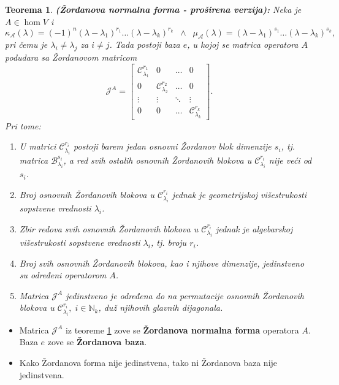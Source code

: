 \documentclass[a4paper,12pt,twoside]{report}
\newtheorem{theorem}{Teorema}[section]
\numberwithin{algorithm}{section}
\begin{document}
\begin{theorem}
    \label{zordan1}
    \textbf{(Žordanova normalna forma - proširena verzija):} Neka je $A \in \hom V$ i 
    \[ \kappa_\mathcal{A}(\lambda) = (-1)^n (\lambda - \lambda_1)^{r_1}\dots (\lambda - \lambda_k)^{r_k} \;\;\land \;\; \mu_\mathcal{A}(\lambda) =  (\lambda - \lambda_1)^{s_1}\dots (\lambda - \lambda_k)^{s_k},\]
    pri čemu je $\lambda_i \neq \lambda_j$ za $i \neq j$. Tada postoji baza $e$, u kojoj se matrica operatora $A$ podudara sa Žordanovom matricom
    \[ \mathcal{J}^A = \begin{bmatrix}
        \mathcal{C}_{\lambda_1}^{r_1} & 0 & \dots & 0 \\
        0 & \mathcal{C}_{\lambda_2}^{r_2} & \dots & 0 \\
        \vdots & \vdots & \ddots & \vdots \\
        0 & 0 & \dots & \mathcal{C}_{\lambda_k}^{r_k}
    \end{bmatrix}. \] Pri tome:
    \begin{enumerate}
        \item U matrici $\mathcal{C}_{\lambda_i}^{r_i}$ postoji barem jedan osnovni Žordanov blok dimenzije $s_i$, tj. matrica $\mathcal{B}_{\lambda_i}^{s_i}$, 
        a red svih ostalih osnovnih Žordanovih blokova u $\mathcal{C}_{\lambda_i}^{r_i}$ nije veći od $s_i$.
        \item Broj osnovnih Žordanovih blokova u $\mathcal{C}_{\lambda_i}^{r_i}$ jednak je geometrijskoj višestrukosti sopstvene vrednosti $\lambda_i$.
        \item Zbir redova svih osnovnih Žordanovih blokova u $\mathcal{C}_{\lambda_i}^{r_i}$ jednak je algebarskoj višestrukosti sopstvene vrednosti $\lambda_i$, tj. broju $r_i$.
        \item Broj svih osnovnih Žordanovih blokova, kao i njihove dimenzije, jedinstveno su određeni operatorom $A$.
        \item Matrica $\mathcal{J}^A$ jedinstveno je određena do na permutacije osnovnih Žordanovih blokova u $\mathcal{C}_{\lambda_i}^{r_i}, \; i \in \mathbb{N}_k$, duž njihovih glavnih dijagonala.
    \end{enumerate}
\end{theorem}

\begin{itemize}
    \item Matrica $\mathcal{J}^A$ iz teoreme \ref{zordan1} zove se \textbf{Žordanova normalna forma} operatora $A$. Baza $e$ zove se \textbf{Žordanova baza}.
    \item Kako Žordanova forma nije jedinstvena, tako ni Žordanova baza nije jedinstvena.
\end{itemize}
\end{document}
